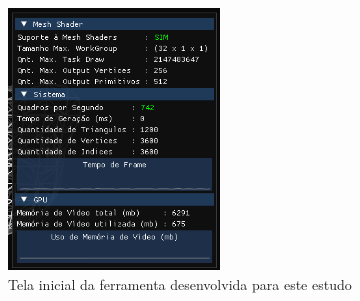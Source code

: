 \begin{figure}
\centering
\includegraphics[width=0.5\textwidth]{imagens/FuncionalidadesFerramenta.png}
\caption{Tela inicial da ferramenta desenvolvida para este estudo}
\label{fig:LABEL_FIG_FUNC_FERRAMENTA}
\end{figure}

